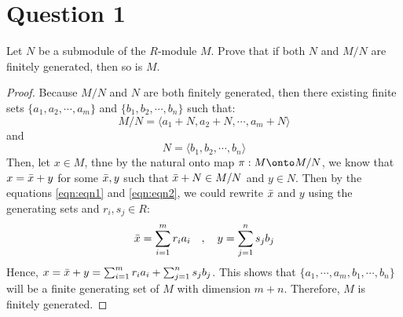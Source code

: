 \section{Question 1}

\begin{question}
    Let $N$ be a submodule of the $R$-module $M$. Prove that if both $N$ and $M / N$ are finitely generated, then so is $M$.
\end{question}

\begin{answer}
    \begin{proof}
        Because $M/N$ and $N$ are both finitely generated, then there existing finite sets $\{a_1,a_2,\cdots,a_m\}$ and $\{b_1,b_2,\cdots,b_n\}$ such that:
        \begin{equation}\label{eqn:eqn1}
            M/N = \langle a_1+N, a_2+N, \cdots, a_m + N \rangle
        \end{equation}
        and
        \begin{equation} \label{eqn:eqn2}
            N = \langle b_1, b_2, \cdots, b_n \rangle
        \end{equation}
        Then, let $x \in M$, thne by the natural onto map $\pi: M \onto M/N$, we know that $x = \Bar{x} + y$ for some $\Bar{x},y$ such that $\Bar{x}+N \in M/N$ and $y \in N$. Then by the equations \ref{eqn:eqn1} and \ref{eqn:eqn2}, we could rewrite $\Bar{x}$ and $y$ using the generating sets and $r_i, s_j \in R$:
        \begin{equation}
                \Bar{x} = \sum_{i = 1}^{m}r_ia_i\quad,\quad y = \sum_{j=1}^{n}s_jb_j
        \end{equation}
        Hence, $x = \Bar{x} + y = \sum_{i = 1}^{m}r_ia_i + \sum_{j=1}^{n}s_jb_j$. This shows that $\{a_1,\cdots,a_m,b_1,\cdots,b_n\}$ will be a finite generating set of $M$ with dimension $m+n$. Therefore, $M$ is finitely generated.
    \end{proof}
\end{answer}